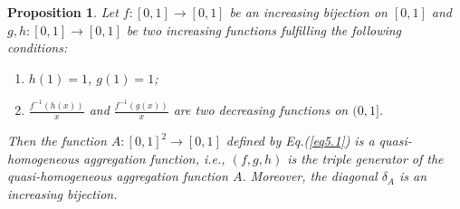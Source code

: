 \documentclass[12pt]{article}
\newtheorem{proposition}{\bf Proposition}[section]
\begin{document}
\begin{proposition}\label{prop5.1}
 Let $f:[0, 1] \rightarrow[0, 1]$ be an increasing bijection on $[0,1]$ and $g, h:[0, 1] \rightarrow[0, 1]$ be two increasing functions fulfilling the following conditions:
 \begin{enumerate}
\item [(1)] $h(1)=1$, $g(1)=1$;
\item [(2)] $\frac {f^{-1}(h(x))}{x}$ and $\frac {f^{-1}(g(x))}{x}$ are two decreasing functions on $(0, 1]$.
\end{enumerate}
Then the function $A:[0, 1]^2\rightarrow[0, 1]$ defined by Eq.(\ref{eq5.1}) is a quasi-homogeneous aggregation function, i.e., $(f, g, h)$ is the triple generator of the quasi-homogeneous aggregation function $A$. Moreover, the diagonal $\delta_{A}$ is an increasing bijection.
\end{proposition}
\end{document}

